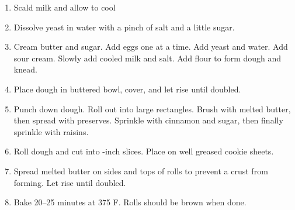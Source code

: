 
\begin{ingredients}
\end{ingredients}


\begin{recipe}
  \begin{enumerate}
  \item Scald milk and allow to cool

  \item Dissolve yeast in water with a pinch of salt and a little
  sugar.

\item Cream butter and sugar.  Add eggs one at a time.  Add yeast and
  water.  Add sour cream.  Slowly add cooled milk and salt.  Add flour
  to form dough and knead.


\item Place dough in buttered bowl, cover, and let rise until doubled.

\item Punch down dough.  Roll out into large rectangles.  Brush with
  melted butter, then spread with preserves.  Sprinkle with cinnamon
  and sugar, then finally sprinkle with raisins.

\item Roll dough and cut into \fracQQ-inch slices.  Place on well
  greased cookie sheets.

\item Spread melted butter on sides and tops of rolls to prevent a
  crust from forming.  Let rise until doubled.

\item Bake 20--25 minutes at 375 F.  Rolls should be brown when done.

  \end{enumerate}
\end{recipe}
